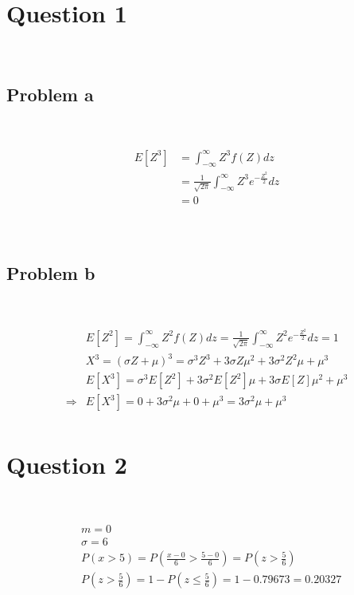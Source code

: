 \documentclass{article}
\begin{document}
\section*{Question 1}

~

\subsection*{Problem a}

~

\begin{equation*}
    \begin{split}
        E[Z^3]&=\int_{-\infty}^{\infty}Z^3f(Z)dz\\
        &=\frac{1}{\sqrt{2\pi}}\int_{-\infty}^{\infty}Z^3e^{-\frac{Z^2}{2}}dz\\
        &=0\\
    \end{split}
\end{equation*}

~

\subsection*{Problem b}

~

\begin{equation*}
    \begin{split}
        &E[Z^2]=\int_{-\infty}^{\infty}Z^2f(Z)dz=\frac{1}{\sqrt{2\pi}}\int_{-\infty}^{\infty}Z^2e^{-\frac{Z^2}{2}}dz=1\\
        &X^3=(\sigma Z+\mu)^3=\sigma^3Z^3+3\sigma Z\mu^2+3\sigma^2Z^2\mu+\mu^3\\
        &E[X^3]=\sigma^3E[Z^2]+3\sigma^2E[Z^2]\mu+3\sigma E[Z]\mu^2+\mu^3\\
        \Rightarrow&E[X^3]=0+3\sigma^2\mu+0+\mu^3=3\sigma^2\mu+\mu^3\\
    \end{split}
\end{equation*}

\newpage

\section*{Question 2}

~

\begin{equation*}
    \begin{split}
        &m=0\\
        &\sigma=6\\
        &P(x>5)=P(\frac{x-0}{6}>\frac{5-0}{6})=P(z>\frac{5}{6})\\
        &P(z>\frac{5}{6})=1-P(z\leqslant\frac{5}{6})=1-0.79673=0.20327\\
    \end{split}
\end{equation*}
\end{document}
